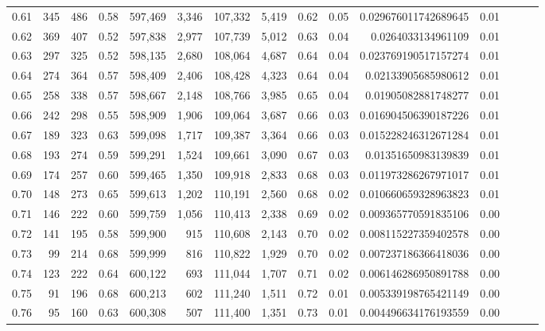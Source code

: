 \begin{tabular}{rrrrrrrrrrrrrrr}
0.61 &     345 &    486 &  0.58 &  597,469 &    3,346 &  107,332 &    5,419 &  0.62 &  0.05 &    0.029676011742689645 &      0.01 \\
0.62 &     369 &    407 &  0.52 &  597,838 &    2,977 &  107,739 &    5,012 &  0.63 &  0.04 &      0.0264033134961109 &      0.01 \\
0.63 &     297 &    325 &  0.52 &  598,135 &    2,680 &  108,064 &    4,687 &  0.64 &  0.04 &    0.023769190517157274 &      0.01 \\
0.64 &     274 &    364 &  0.57 &  598,409 &    2,406 &  108,428 &    4,323 &  0.64 &  0.04 &     0.02133905685980612 &      0.01 \\
0.65 &     258 &    338 &  0.57 &  598,667 &    2,148 &  108,766 &    3,985 &  0.65 &  0.04 &     0.01905082881748277 &      0.01 \\
0.66 &     242 &    298 &  0.55 &  598,909 &    1,906 &  109,064 &    3,687 &  0.66 &  0.03 &    0.016904506390187226 &      0.01 \\
0.67 &     189 &    323 &  0.63 &  599,098 &    1,717 &  109,387 &    3,364 &  0.66 &  0.03 &    0.015228246312671284 &      0.01 \\
0.68 &     193 &    274 &  0.59 &  599,291 &    1,524 &  109,661 &    3,090 &  0.67 &  0.03 &     0.01351650983139839 &      0.01 \\
0.69 &     174 &    257 &  0.60 &  599,465 &    1,350 &  109,918 &    2,833 &  0.68 &  0.03 &    0.011973286267971017 &      0.01 \\
0.70 &     148 &    273 &  0.65 &  599,613 &    1,202 &  110,191 &    2,560 &  0.68 &  0.02 &    0.010660659328963823 &      0.01 \\
0.71 &     146 &    222 &  0.60 &  599,759 &    1,056 &  110,413 &    2,338 &  0.69 &  0.02 &    0.009365770591835106 &      0.00 \\
0.72 &     141 &    195 &  0.58 &  599,900 &      915 &  110,608 &    2,143 &  0.70 &  0.02 &    0.008115227359402578 &      0.00 \\
0.73 &      99 &    214 &  0.68 &  599,999 &      816 &  110,822 &    1,929 &  0.70 &  0.02 &    0.007237186366418036 &      0.00 \\
0.74 &     123 &    222 &  0.64 &  600,122 &      693 &  111,044 &    1,707 &  0.71 &  0.02 &    0.006146286950891788 &      0.00 \\
0.75 &      91 &    196 &  0.68 &  600,213 &      602 &  111,240 &    1,511 &  0.72 &  0.01 &    0.005339198765421149 &      0.00 \\
0.76 &      95 &    160 &  0.63 &  600,308 &      507 &  111,400 &    1,351 &  0.73 &  0.01 &    0.004496634176193559 &      0.00 \\

\end{tabular}
